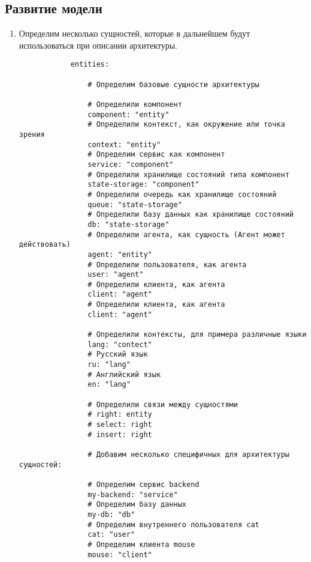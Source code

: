 \documentclass[final]{article}
\begin{document}
    \subsection{Развитие модели}
        \begin{enumerate}
            \item Определим несколько сущностей, которые в дальнейшем будут
            использоваться при описании архитектуры.

            \begin{verbatim}
            entities:

                # Определим базовые сущности архитектуры 

                # Определили компонент
                component: "entity"
                # Определили контекст, как окружение или точка зрения
                context: "entity"
                # Определим сервис как компонент
                service: "component"
                # Определили хранилище состояний типа компонент
                state-storage: "component"
                # Определили очередь как хранилище состояний
                queue: "state-storage"
                # Определили базу данных как хранилище состояний
                db: "state-storage"
                # Определили агента, как сущность (Агент может действовать)
                agent: "entity"
                # Определили пользователя, как агента
                user: "agent"
                # Определили клиента, как агента
                client: "agent"
                # Определили клиента, как агента
                client: "agent"

                # Определили контексты, для примера различные языки
                lang: "contect"
                # Русский язык
                ru: "lang"
                # Английский язык
                en: "lang"

                # Определили связи между сущностями
                # right: entity
                # select: right
                # insert: right

                # Добавим несколько специфичных для архитектуры сущностей:

                # Определим сервис backend
                my-backend: "service"
                # Определим базу данных 
                my-db: "db"
                # Определим внутреннего пользователя cat
                cat: "user"
                # Определим клиента mouse
                mouse: "client"
            \end{verbatim}
        \end{enumerate}
\end{document}
